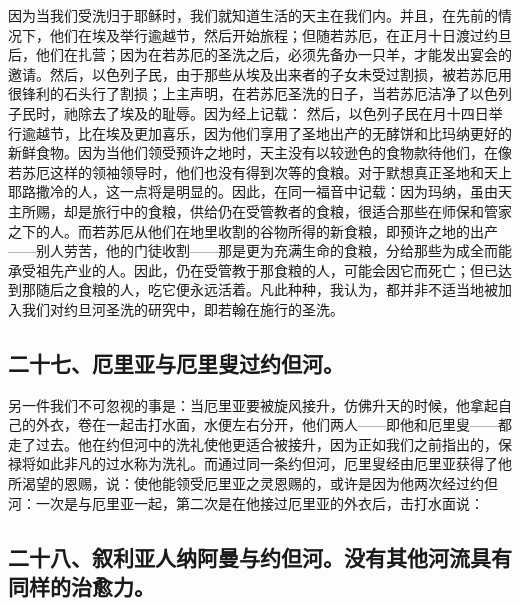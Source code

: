 因为当我们受洗归于耶稣时，我们就知道生活的天主在我们内。并且，在先前的情况下，他们在埃及举行逾越节，然后开始旅程；但随若苏厄，在正月十日渡过约旦后，他们在扎营；因为在若苏厄的圣洗之后，必须先备办一只羊，才能发出宴会的邀请。然后，以色列子民，由于那些从埃及出来者的子女未受过割损，被若苏厄用很锋利的石头行了割损；上主声明，在若苏厄圣洗的日子，当若苏厄洁净了以色列子民时，祂除去了埃及的耻辱。因为经上记载： 然后，以色列子民在月十四日举行逾越节，比在埃及更加喜乐，因为他们享用了圣地出产的无酵饼和比玛纳更好的新鲜食物。因为当他们领受预许之地时，天主没有以较逊色的食物款待他们，在像若苏厄这样的领袖领导时，他们也没有得到次等的食粮。对于默想真正圣地和天上耶路撒冷的人，这一点将是明显的。因此，在同一福音中记载：因为玛纳，虽由天主所赐，却是旅行中的食粮，供给仍在受管教者的食粮，很适合那些在师保和管家之下的人。而若苏厄从他们在地里收割的谷物所得的新食粮，即预许之地的出产——别人劳苦，他的门徒收割——那是更为充满生命的食粮，分给那些为成全而能承受祖先产业的人。因此，仍在受管教于那食粮的人，可能会因它而死亡；但已达到那随后之食粮的人，吃它便永远活着。凡此种种，我认为，都并非不适当地被加入我们对约旦河圣洗的研究中，即若翰在施行的圣洗。\par


\subsection{二十七、厄里亚与厄里叟过约但河。}

另一件我们不可忽视的事是：当厄里亚要被旋风接升，仿佛升天的时候，他拿起自己的外衣，卷在一起击打水面，水便左右分开，他们两人——即他和厄里叟——都走了过去。他在约但河中的洗礼使他更适合被接升，因为正如我们之前指出的，保禄将如此非凡的过水称为洗礼。而通过同一条约但河，厄里叟经由厄里亚获得了他所渴望的恩赐，说：使他能领受厄里亚之灵恩赐的，或许是因为他两次经过约但河：一次是与厄里亚一起，第二次是在他接过厄里亚的外衣后，击打水面说：\par


\subsection{二十八、叙利亚人纳阿曼与约但河。没有其他河流具有同样的治愈力。}

